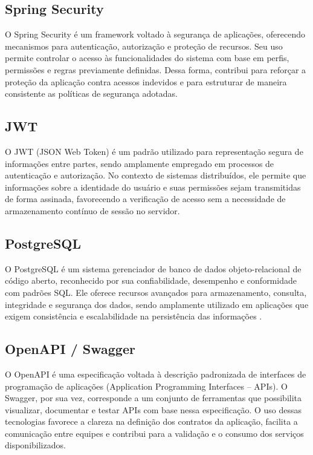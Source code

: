 \subsection{Spring Security}
O Spring Security é um framework voltado à segurança de aplicações, oferecendo mecanismos para autenticação, autorização e proteção de recursos. Seu uso permite controlar o acesso às funcionalidades do sistema com base em perfis, permissões e regras previamente definidas. Dessa forma, contribui para reforçar a proteção da aplicação contra acessos indevidos e para estruturar de maneira consistente as políticas de segurança adotadas.

\subsection{JWT}
O JWT (JSON Web Token) é um padrão utilizado para representação segura de informações entre partes, sendo amplamente empregado em processos de autenticação e autorização. No contexto de sistemas distribuídos, ele permite que informações sobre a identidade do usuário e suas permissões sejam transmitidas de forma assinada, favorecendo a verificação de acesso sem a necessidade de armazenamento contínuo de sessão no servidor.

\subsection{PostgreSQL}
O PostgreSQL é um sistema gerenciador de banco de dados objeto-relacional de código aberto, reconhecido por sua confiabilidade, desempenho e conformidade com padrões SQL. Ele oferece recursos avançados para armazenamento, consulta, integridade e segurança dos dados, sendo amplamente utilizado em aplicações que exigem consistência e escalabilidade na persistência das informações \cite{postgresql2026}.

\subsection{OpenAPI / Swagger}
O OpenAPI é uma especificação voltada à descrição padronizada de interfaces de programação de aplicações (Application Programming Interfaces – APIs). O Swagger, por sua vez, corresponde a um conjunto de ferramentas que possibilita visualizar, documentar e testar APIs com base nessa especificação. O uso dessas tecnologias favorece a clareza na definição dos contratos da aplicação, facilita a comunicação entre equipes e contribui para a validação e o consumo dos serviços disponibilizados.

